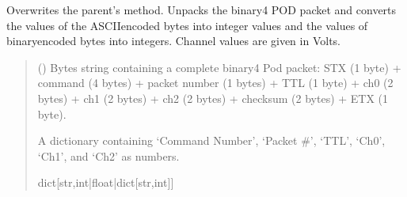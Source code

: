 \documentclass[letterpaper,10pt,english]{sphinxmanual}
\begin{document}
\begin{fulllineitems}
\begin{fulllineitems}
\label{\detokenize{PodDevice_8206HR:PodDevice_8206HR.POD_8206HR.TranslatePODpacket_Binary}}
\pysigstartsignatures
{}
\pysigstopsignatures
\sphinxAtStartPar
Overwrites the parent’s method. Unpacks the binary4 POD packet and converts the values of the         ASCII\sphinxhyphen{}encoded bytes into integer values and the values of binary\sphinxhyphen{}encoded bytes into integers.         Channel values are given in Volts.
\begin{quote}\begin{description}
\sphinxAtStartPar
{} () \textendash{} Bytes string containing a complete binary4 Pod packet:  STX (1 byte)                 + command (4 bytes) + packet number (1 bytes) + TTL (1 byte) + ch0 (2 bytes)                 + ch1 (2 bytes) + ch2 (2 bytes) + checksum (2 bytes) + ETX (1 byte).

\sphinxAtStartPar
A dictionary containing ‘Command Number’, ‘Packet \#’,             ‘TTL’, ‘Ch0’, ‘Ch1’, and ‘Ch2’ as numbers.

\sphinxAtStartPar
dict{[}str,int|float|dict{[}str,int{]}{]}

\end{description}\end{quote}

\end{fulllineitems}



\end{fulllineitems}
\end{document}
